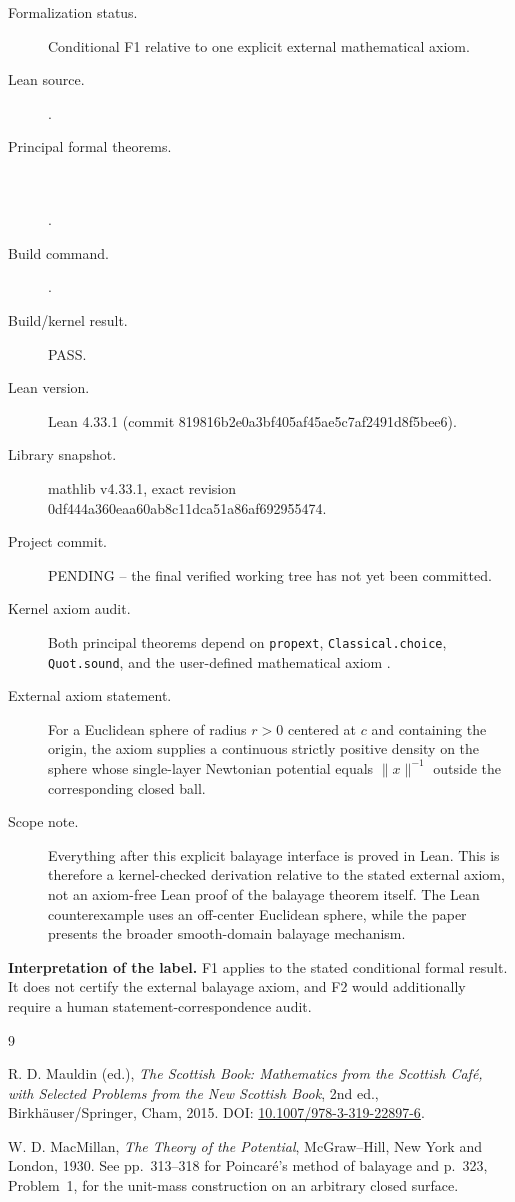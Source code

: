 \documentclass[11pt]{article}
\begin{document}
\begin{description}
\item[Formalization status.] Conditional F1 relative to one explicit external mathematical axiom.
\item[Lean source.] \texttt{}.
\item[Principal formal theorems.] \mbox{}\\
\texttt{}\\
\texttt{}.
\item[Build command.] \texttt{}.
\item[Build/kernel result.] PASS.
\item[Lean version.] Lean 4.33.1 (commit 819816b2e0a3bf405af45ae5c7af2491d8f5bee6).
\item[Library snapshot.] mathlib v4.33.1, exact revision 0df444a360eaa60ab8c11dca51a86af692955474.
\item[Project commit.] PENDING -- the final verified working tree has not yet been committed.
\item[Kernel axiom audit.] Both principal theorems depend on \texttt{propext}, \texttt{Classical.choice}, \texttt{Quot.sound}, and the user-defined mathematical axiom \texttt{}.
\item[External axiom statement.] For a Euclidean sphere of radius $r>0$ centered at $c$ and containing the origin, the axiom supplies a continuous strictly positive density on the sphere whose single-layer Newtonian potential equals $\|x\|^{-1}$ outside the corresponding closed ball.
\item[Scope note.] Everything after this explicit balayage interface is proved in Lean. This is therefore a kernel-checked derivation relative to the stated external axiom, not an axiom-free Lean proof of the balayage theorem itself. The Lean counterexample uses an off-center Euclidean sphere, while the paper presents the broader smooth-domain balayage mechanism.
\end{description}

\noindent\textbf{Interpretation of the label.} F1 applies to the stated conditional formal result. It does not certify the external balayage axiom, and F2 would additionally require a human statement-correspondence audit.
\endgroup

\begin{thebibliography}{9}

R. D. Mauldin (ed.),
\emph{The Scottish Book: Mathematics from the Scottish Caf\'e, with Selected Problems from the New Scottish Book},
2nd ed., Birkh\"auser/Springer, Cham, 2015.
DOI: \href{https://doi.org/10.1007/978-3-319-22897-6}{10.1007/978-3-319-22897-6}.

W. D. MacMillan,
\emph{The Theory of the Potential},
McGraw--Hill, New York and London, 1930.
See pp.~313--318 for Poincar\'e's method of balayage and p.~323, Problem~1, for the unit-mass construction on an arbitrary closed surface.

\end{thebibliography}
\end{document}

